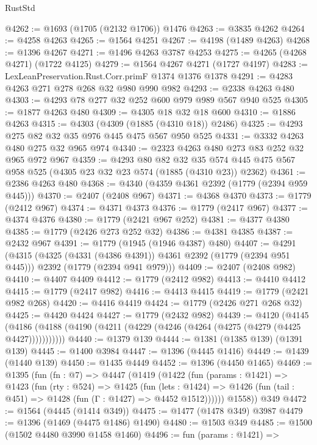 \begin{lexlean}{RustStd}
\begin{coremodule}
@4262 := @1693 (@1705 (@2132 @1706)) @1476
@4263 := @3835 @4262
@4264 := @4258 @4263
@4265 := @1564 @4251
@4267 := @4198 (@1489 @4263)
@4268 := @1396 @4267
@4271 := @1496 @4263 @3787 @4253
@4275 := @4265 (@4268 @4271) (@1722 @4125)
@4279 := @1564 @4267 @4271 (@1727 @4197)
@4283 := LexLeanPreservation.Rust.Corr.primF @1374 @1376 @1378
@4291 := @4283 @4263 @271 @278 @268 @32 @980 @990 @982
@4293 := @2338 @4263 @480
@4303 := @4293 @78 @277 @32 @252 @600 @979 @989 @567 @940 @525
@4305 := @1877 @4263 @480
@4309 := @4305 @18 @32 @18 @600
@4310 := @1886 @4263
@4315 := @4303 (@4309 (@1885 (@4310 @18)) @2486)
@4325 := @4293 @275 @82 @32 @35 @976 @445 @475 @567 @950 @525
@4331 := @3332 @4263 @480 @275 @32 @965 @974
@4340 := @2323 @4263 @480 @273 @83 @252 @32 @965 @972 @967
@4359 := @4293
    @80
    @82
    @32
    @35
    @574
    @445
    @475
    @567
    @958
    @525
    (@4305 @23 @32 @23 @574 (@1885 (@4310 @23)) @2362)
@4361 := @2386 @4263 @480
@4368 := @4340 (@4359 @4361 @2392 (@1779 (@2394 @959 @445)))
@4370 := @2407 (@2408 @967)
@4371 := @4368 @4370
@4373 := @1779 (@2412 @967)
@4374 := @4371 @4373
@4376 := @1779 (@2417 @967)
@4377 := @4374 @4376
@4380 := @1779 (@2421 @967 @252)
@4381 := @4377 @4380
@4385 := @1779 (@2426 @273 @252 @32)
@4386 := @4381 @4385
@4387 := @2432 @967
@4391 := @1779 (@1945 (@1946 @4387) @480)
@4407 := @4291
    (@4315
      (@4325 (@4331 (@4386 @4391)) @4361 @2392 (@1779 (@2394 @951 @445)))
      @2392
      (@1779 (@2394 @941 @979)))
@4409 := @2407 (@2408 @982)
@4410 := @4407 @4409
@4412 := @1779 (@2412 @982)
@4413 := @4410 @4412
@4415 := @1779 (@2417 @982)
@4416 := @4413 @4415
@4419 := @1779 (@2421 @982 @268)
@4420 := @4416 @4419
@4424 := @1779 (@2426 @271 @268 @32)
@4425 := @4420 @4424
@4427 := @1779 (@2432 @982)
@4439 := @4120
    (@4145 (@4186 (@4188 (@4190 (@4211 (@4229 (@4246 (@4264 (@4275 (@4279 (@4425 @4427)))))))))))
@4440 := @1379 @139
@4444 := @1381 (@1385 @139) (@1391 @139)
@4445 := @1400 @3984
@4447 := @1396 (@4445 @1416)
@4449 := @1439 (@1440 @139)
@4450 := @1435 @4449
@4452 := @1396 (@4450 @1465)
@4469 := @1395
    (fun (fn : @7) =>
    @4447
      (@1419
        (@1422
          (fun (params : @1421) =>
          @1423
            (fun (rty : @524) =>
            @1425
              (fun (lets : @1424) =>
              @1426 (fun (tail : @451) => @1428 (fun (Γ : @1427) => @4452 @1512))))))
        @1558))
    @349
@4472 := @1564 (@4445 (@1414 @349))
@4475 := @1477 (@1478 @349) @3987
@4479 := @1396 (@1469 (@4475 @1486) @1490)
@4480 := @1503 @349
@4485 := @1500 (@1502 @4480 @3990 @1458 @1460)
@4496 := fun (params : @1421) =>

\end{coremodule}
\end{lexlean}
